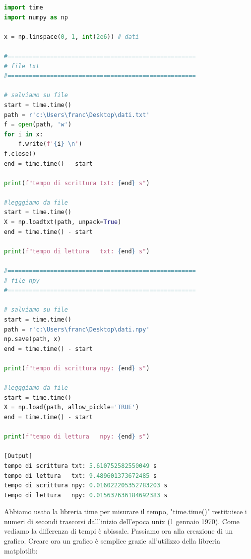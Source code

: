 \documentclass[10pt,a4paper]{article}
\begin{document}
\begin{lstlisting}[language=Python]
import time
import numpy as np

x = np.linspace(0, 1, int(2e6)) # dati

#=====================================================
# file txt
#=====================================================

# salviamo su file
start = time.time()
path = r'c:\Users\franc\Desktop\dati.txt'
f = open(path, 'w')
for i in x:
    f.write(f'{i} \n')
f.close()
end = time.time() - start

print(f"tempo di scrittura txt: {end} s")

#legggiamo da file
start = time.time()
X = np.loadtxt(path, unpack=True)
end = time.time() - start

print(f"tempo di lettura   txt: {end} s")

#=====================================================
# file npy
#=====================================================

# salviamo su file
start = time.time()
path = r'c:\Users\franc\Desktop\dati.npy'
np.save(path, x)
end = time.time() - start

print(f"tempo di scrittura npy: {end} s")

#legggiamo da file
start = time.time()
X = np.load(path, allow_pickle='TRUE')
end = time.time() - start

print(f"tempo di lettura   npy: {end} s")

[Output]
tempo di scrittura txt: 5.610752582550049 s
tempo di lettura   txt: 9.489601373672485 s
tempo di scrittura npy: 0.016022205352783203 s
tempo di lettura   npy: 0.015637636184692383 s

\end{lstlisting}
Abbiamo usato la libreria time per misurare il tempo, "time.time()" restituisce i numeri di secondi trascorsi dall'inizio dell'epoca unix (1 gennaio 1970).
Come vediamo la differenza di tempi è abissale. Passiamo ora alla creazione di un grafico. Creare ora un grafico è semplice grazie all'utilizzo della libreria matplotlib:
\end{document}

